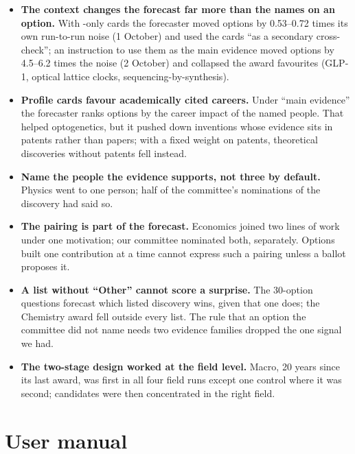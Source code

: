 \documentclass[11pt,a4paper]{article}
\begin{document}
\begin{itemize}
\item \textbf{The context changes the forecast far more than the names on an option.} With -only cards
  the forecaster moved options by 0.53--0.72 times its own run-to-run noise (1 October) and used the cards ``as a
  secondary cross-check''; an  instruction to use them as the main evidence moved options by 4.5--6.2
  times the noise (2 October) and collapsed the award favourites (GLP-1, optical lattice clocks, sequencing-by-synthesis).
\item \textbf{Profile cards favour academically cited careers.} Under ``main evidence'' the forecaster ranks options by
  the career impact of the named people. That helped optogenetics, but it pushed down inventions whose evidence sits in
  patents rather than papers; with a fixed weight on patents, theoretical discoveries without patents fell instead.
\item \textbf{Name the people the evidence supports, not three by default.} Physics went to one person; half of the
  committee's nominations of the discovery had said so.
\item \textbf{The pairing is part of the forecast.} Economics joined two lines of work under one motivation; our
  committee nominated both, separately. Options built one contribution at a time cannot express such a pairing unless a
  ballot proposes it.
\item \textbf{A list without ``Other'' cannot score a surprise.} The 30-option questions forecast which listed
  discovery wins, given that one does; the Chemistry award fell outside every list. The rule that an option the committee
  did not name needs two evidence families dropped the one signal we had.
\item \textbf{The two-stage design worked at the field level.} Macro, 20 years since its last award, was first in all
  four field runs except one control where it was second; candidates were then concentrated in the right field.
\end{itemize}
\part{User manual}\label{part:usage}
\end{document}

